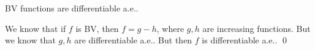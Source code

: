 




\begin{cor}
BV functions are differentiable a.e.. 
\end{cor}

\pf We know that if $f$ is BV, then $f= g-h$, where $g,h$ are increasing functions. But we know that $g,h$ are differentiable a.e.. But then $f$ is differentiable a.e.. \qed \\
















